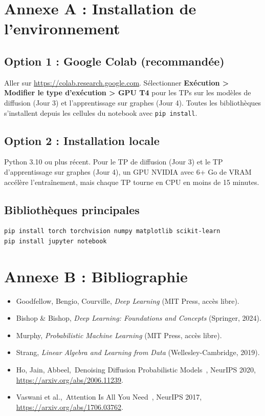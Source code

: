 \documentclass[12pt,a4paper,twoside]{book}
\providecommand{\og}{\guillemotleft\,}
\providecommand{\fg}{\,\guillemotright}
\begin{document}
\backmatter

\chapter*{Annexe A : Installation de l'environnement}

\section*{Option 1 : Google Colab (recommandée)}
Aller sur \url{https://colab.research.google.com}. Sélectionner \textbf{Exécution > Modifier le type d'exécution > GPU T4} pour les TPs sur les modèles de diffusion (Jour 3) et l'apprentissage sur graphes (Jour 4). Toutes les bibliothèques s'installent depuis les cellules du notebook avec \texttt{pip install}.

\section*{Option 2 : Installation locale}
Python 3.10 ou plus récent. Pour le TP de diffusion (Jour 3) et le TP d'apprentissage sur graphes (Jour 4), un GPU NVIDIA avec 6+ Go de VRAM accélère l'entraînement, mais chaque TP tourne en CPU en moins de 15 minutes.

\section*{Bibliothèques principales}
\begin{verbatim}
pip install torch torchvision numpy matplotlib scikit-learn
pip install jupyter notebook
\end{verbatim}

\chapter*{Annexe B : Bibliographie}

\begin{itemize}
  \item Goodfellow, Bengio, Courville, \emph{Deep Learning} (MIT Press, accès libre).
  \item Bishop \& Bishop, \emph{Deep Learning: Foundations and Concepts} (Springer, 2024).
  \item Murphy, \emph{Probabilistic Machine Learning} (MIT Press, accès libre).
  \item Strang, \emph{Linear Algebra and Learning from Data} (Wellesley-Cambridge, 2019).
  \item Ho, Jain, Abbeel, \og Denoising Diffusion Probabilistic Models \fg, NeurIPS 2020, \url{https://arxiv.org/abs/2006.11239}.
  \item Vaswani et al., \og Attention Is All You Need \fg, NeurIPS 2017, \url{https://arxiv.org/abs/1706.03762}.
\end{itemize}
\end{document}
